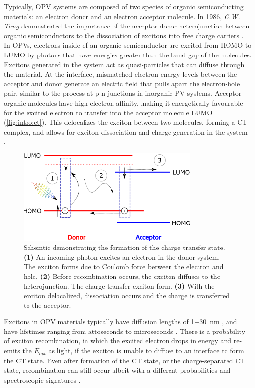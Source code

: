 Typically, \ac{OPV} systems are composed of two species of organic semiconducting materials: an electron donor and an electron acceptor molecule. In 1986, \textit{C.W. Tang} demonstrated the importance of the acceptor-donor heterojunction between organic semiconductors to the dissociation of excitons into free charge carriers \citep{tang1986two}. In \acp{OPV}, electrons inside of an organic semiconductor are excited from \ac{HOMO} to \ac{LUMO} by photons that have energies greater than the band gap of the molecules. Excitons generated in the system act as quasi-particles that can diffuse through the material. At the interface, mismatched electron energy levels between the acceptor and donor generate an electric field that pulls apart the electron-hole pair, similar to the process at p-n junctions in inorganic PV systems. Acceptor organic molecules have high electron affinity, making it energetically favourable for the excited electron to transfer into the acceptor molecule \ac{LUMO} (\autoref{fig:intro:ct}). This delocalizes the exciton between two molecules, forming a \ac{CT} complex, and allows for exciton dissociation and charge generation in the system \citep{bernardo2014delocalization}.

\begin{figure}[h]
    \centering
    \includegraphics[width=0.8\textwidth]{pictures/CT_energy.png}
    \caption{Schemtic demonstrating the formation of the charge transfer state. \textbf{(1)} An incoming photon excites an electron in the donor system. The exciton forms due to Coulomb force between the electron and hole. \textbf{(2)} Before recombination occurs, the exciton diffuses to the heterojunction. The charge transfer exciton form. \textbf{(3)} With the exciton delocalized, dissociation occurs and the charge is transferred to the acceptor.}
    \label{fig:intro:ct}
\end{figure}

Excitons in \ac{OPV} materials typically have diffusion lengths of 1\SI{-30}{nm} \citep{proctor2013charge}, and have lifetimes ranging from attoseconds to microseconds \citep{tamai2015exciton}. There is a probability of exciton recombination, in which the excited electron drops in energy and re-emits the $E_{opt}$ as light, if the exciton is unable to diffuse to an interface to form the \ac{CT} state. Even after formation of the \ac{CT} state, or the charge-separated \ac{CT} state, recombination can still occur albeit with a different probabilities and spectroscopic signatures \citep{deibel2010role}.

